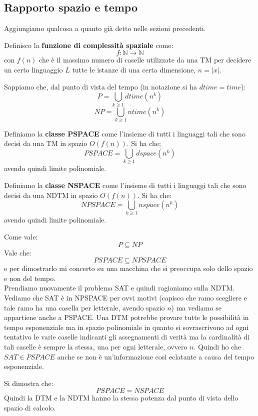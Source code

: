 \subsection{Rapporto spazio e tempo}
Aggiungiamo qualcosa a quanto già detto nelle sezioni precedenti.\\
\begin{definizione}
  Definisco la \textbf{funzione di complessità spaziale} come:
  \[f:\mathbb{N}\to\mathbb{N}\]
  con $f(n)$ che è il massimo numero di caselle utilizzate da una TM per
  decidere un certo linguaggio $L$ tutte le istanze di una certa dimensione,
  $n=|x|$. 
\end{definizione}
Sappiamo che, dal punto di vista del tempo (in notazione si ha $dtime=time$):
\[P=\bigcup_{k\geq 1}dtime(n^k)\]
\[NP=\bigcup_{k\geq 1}ntime(n^k)\]
\begin{definizione}
  Definiamo la \textbf{classe PSPACE} come l'insieme di tutti i linguaggi tali
  che sono decisi da una TM in spazio $O(f(n))$. Si ha che;
  \[PSPACE=\bigcup_{k\geq 1}dspace(n^k)\]
  avendo quindi limite polinomiale.
\end{definizione}
\begin{definizione}
  Definiamo la \textbf{classe NSPACE} come l'insieme di tutti i linguaggi tali
  che sono decisi da una NDTM in spazio $O(f(n))$. Si ha che:
  \[NPSPACE=\bigcup_{k\geq 1}nspace(n^k)\]
  avendo quindi limite polinomiale.
\end{definizione}
Come vale:
\[P\subseteq NP\]
Vale che:
\[PSPACE\subseteq NPSPACE\]
e per dimostrarlo mi concerto su una macchina che si preoccupa solo dello spazio
e non del tempo.\\
Prendiamo nuovamente il problema SAT e quindi ragioniamo sulla NDTM. Vediamo che
SAT è in NPSPACE per ovvi motivi (capisco che ramo scegliere e tale ramo ha una
casella per letterale, avendo spazio $n$) ma vediamo se appartiene anche a
PSPACE. Una DTM potrebbe provare tutte le possibilità in tempo esponenziale ma
in spazio polinomiale in quanto si sovrascrivono ad ogni tentativo le varie
caselle indicanti gli assegnamenti di verità ma la cardinalità di tali caselle è
sempre la stessa, una per ogni letterale, ovvero $n$. Quindi ho che $SAT\in
PSPACE$ anche se non è un'informazione così eclatante a causa del tempo
esponenziale.
\begin{definizione}
  Si dimostra che:
  \[PSPACE=NSPACE\]
  Quindi la DTM e la NDTM hanno la stessa potenza dal punto di vista dello
  spazio di calcolo.
\end{definizione}
